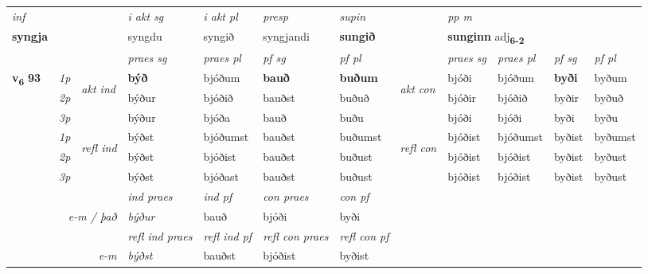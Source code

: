 \begin{longtable}[l]{X>{\footnotesize\itshape}llXXXXlXXXX}
   {\textit{inf}} & &  & \textit{i akt sg} & \textit{i akt pl}   & \textit{presp} & \textit{supin}  && \textit{pp m} \\*
  {\textbf{syngja}} & && syngdu  & syngið   & syngjandi &  \textbf{sungið}  && \multicolumn{2}{l}{\textbf{sunginn} adj\textbf{\textsubscript{6-2}}} \\*

\midrule

 & &   & \textit{praes sg}  & \textit{praes pl}    & \textit{ pf sg} & \textit{pf pl} & & \textit{praes sg}  & \textit{praes pl}    & \textit{pf sg} & \textit{pf pl }  \\ \cmidrule{4-7} \cmidrule{9-12}
 \multirow{2}{*}{{{\textbf{v{\textsubscript{6}}} \Large{\textbf{93}}}}}  & 1p & \multirow{3}{*}{\begin{turn}{90}\textit{akt ind}\end{turn}} & \textbf{býð} & bjóðum & \textbf{bauð} & \textbf{buðum} & \multirow{3}{*}{\begin{turn}{90}\textit{akt con}\end{turn}} &bjóði & bjóðum & \textbf{byði} & byðum\\*
 & 2p &  &  býður  & bjóðið & bauðst & buðuð & & bjóðir & bjóðið & byðir & byðuð \\*
 & 3p &  & býður & bjóða & bauð & buðu & & bjóði & bjóði& byði & byðu \\*
\cmidrule{4-7} \cmidrule{9-12}
 & 1p & \multirow{3}{*}{\begin{turn}{90}\textit{refl ind}\end{turn}}  & býðst & bjóðumst & bauðst & buðumst & \multirow{3}{*}{\begin{turn}{90}\textit{refl con}\end{turn}}  &bjóðist & bjóðumst & byðist & byðumst \\*
 & 2p &  & býðst & bjóðist & bauðst & buðust & &bjóðist & bjóðist & byðist & byðust \\*
 & 3p  & & býðst & bjóðast & bauðst & buðust & & bjóðist & bjóðist& byðist & byðust \\*
\cmidrule{4-7} \cmidrule{9-12}

   && &  \textit{ind praes} & \textit{ind pf} & \textit{con praes} & \textit{con pf} \\*
\multicolumn{3}{r}{\textit{e-m / það}} & býður & bauð & bjóði & byði \\*

\cmidrule{4-7}
 & && \textit{refl ind praes} & \textit{refl ind pf} & \textit{refl con praes} & \textit{refl con pf} \\*
\multicolumn{3}{r}{\textit{e-m}}& býðst & bauðst & bjóðist & byðist \\*


\end{longtable}
